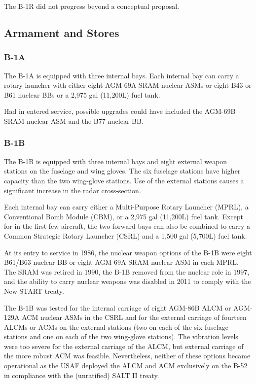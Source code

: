The B-1R did not progress beyond a conceptual proposal.

\subsection{Armament and Stores}

\subsubsection{B-1A}

The B-1A is equipped with three internal bays. Each internal bay can carry a rotary launcher with either eight AGM-69A SRAM nuclear ASMs or eight B43 or B61 nuclear BBs or a 2,975 gal (11,200L) fuel tank.

Had in entered service, possible upgrades could have included the AGM-69B SRAM nuclear ASM and the B77 nuclear BB.

\subsubsection{B-1B}

The B-1B is equipped with three internal bays and eight external weapon stations on the fuselage and wing gloves. The six fuselage stations have higher capacity than the two wing-glove stations. Use of the external stations causes a significant increase in the radar cross-section.

Each internal bay can carry either a Multi-Purpose Rotary Launcher (MPRL), a Conventional Bomb Module (CBM), or a 2,975 gal (11,200L) fuel tank. Except for in the first few aircraft, the two forward bays can also be combined to carry a Common Strategic Rotary Launcher (CSRL) and a 1,500 gal (5,700L) fuel tank.

At its entry to service in 1986, the nuclear weapon options of the B-1B were eight B61/B63 nuclear BB or eight AGM-69A SRAM nuclear ASM in each MPRL. The SRAM was retired in 1990, the B-1B removed from the nuclear role in 1997, and the ability to carry nuclear weapons was disabled in 2011 to comply with the New START treaty.

The B-1B was tested for the internal carriage of eight AGM-86B ALCM or AGM-129A ACM nuclear ASMs in the CSRL and for the external carriage of fourteen ALCMs or ACMs on the external stations (two on each of the six fuselage stations and one on each of the two wing-glove stations). The vibration levels were too severe for the external carriage of the ALCM, but external carriage of the more robust ACM was feasible. Nevertheless, neither of these options became operational as the USAF deployed the ALCM and ACM exclusively on the B-52 in compliance with the (unratified) SALT II treaty.

